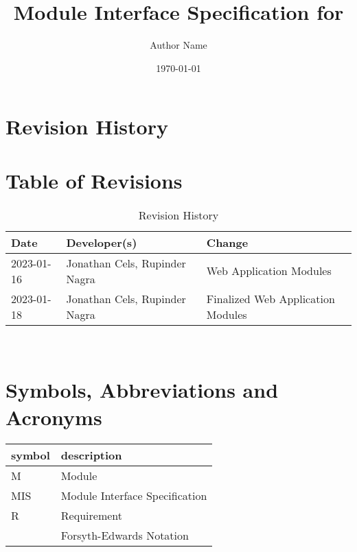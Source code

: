 \documentclass[12pt, titlepage]{article}
\begin{document}
\title{Module Interface Specification for \progname{}}

\author{Author Name}

\date{\today}

\maketitle


\section{Revision History}

\section*{Table of Revisions}
\begin{table}[hp]
\caption{Revision History} \label{TblRevisionHistory}
\begin{tabularx}{\textwidth}{llX}
\toprule
\textbf{Date} & \textbf{Developer(s)} & \textbf{Change}\\
\midrule
2023-01-16 & Jonathan Cels, Rupinder Nagra & Web Application Modules\\
2023-01-18 & Jonathan Cels, Rupinder Nagra & Finalized Web Application Modules\\
\bottomrule
\end{tabularx}
\end{table}

~\newpage

\section{Symbols, Abbreviations and Acronyms}

\renewcommand{\arraystretch}{1.2}
\begin{tabular}{l l} 
  \toprule		
  \textbf{symbol} & \textbf{description}\\
  \midrule 
  M & Module \\
  MIS & Module Interface Specification \\
  R & Requirement\\
  \cite{FEN} & Forsyth-Edwards Notation\\
  \bottomrule
\end{tabular}\\

\newpage
\end{document}
